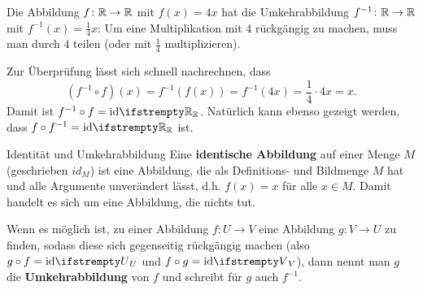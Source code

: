 \documentclass[../../main.tex]{subfiles}
\begin{document}
\begin{example}
    Die Abbildung $f\colon\mathbb{R}\rightarrow\mathbb{R}$ mit $f(x)=4x$ hat die Umkehrabbildung $f^{-1}\colon\mathbb{R}\rightarrow\mathbb{R}$ mit $f^{-1}(x)=\frac{1}{4}x$: Um eine Multiplikation mit $4$ rückgängig zu machen, muss man durch $4$ teilen (oder mit $\frac{1}{4}$ multiplizieren).
    
    Zur Überprüfung lässt sich schnell nachrechnen, dass \[(f^{-1}\circ f)(x)=f^{-1}(f(x))=f^{-1}(4x)=\frac{1}{4}\cdot 4x=x.\] 
    Damit ist $f^{-1}\circ f=\ident[\Real]$. Natürlich kann ebenso gezeigt werden, dass $f\circ f^{-1}=\ident[\Real]$ ist.
\end{example}

\begin{nutshell}{Identität und Umkehrabbildung}
    \sloppy
    Eine \textbf{identische Abbildung} auf einer Menge $M$ (geschrieben $id_M$) ist eine Abbildung, die als Definitions- und Bildmenge $M$ hat und alle Argumente unverändert lässt, d.h. $f(x)=x$ für alle $x\in M$. Damit handelt es sich um eine Abbildung, die nichts tut.
    
    Wenn es möglich ist, zu einer Abbildung $f\colon U\rightarrow V$ eine Abbildung $g\colon V\rightarrow U$ zu finden, sodass diese sich gegenseitig rückgängig machen (also $g\circ f=\ident[U]$ und $f\circ g=\ident[V]$), dann nennt man $g$ die \textbf{Umkehrabbildung} von $f$ und schreibt für $g$ auch $f^{-1}$.
\end{nutshell}
\end{document}

